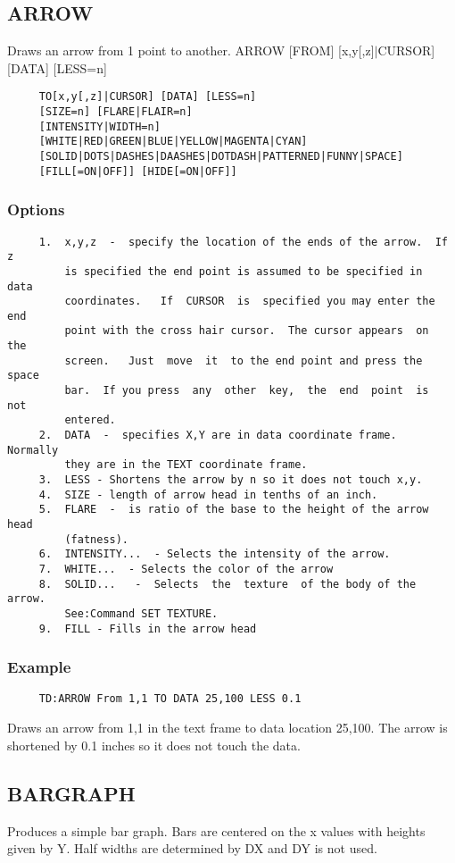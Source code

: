 \subsection{ARROW}
Draws an arrow from 1 point to another.  
ARROW [FROM] [x,y[,z]$|$CURSOR] [DATA] [LESS=n] 
\begin{verbatim}
     TO[x,y[,z]|CURSOR] [DATA] [LESS=n] 
     [SIZE=n] [FLARE|FLAIR=n] 
     [INTENSITY|WIDTH=n] 
     [WHITE|RED|GREEN|BLUE|YELLOW|MAGENTA|CYAN] 
     [SOLID|DOTS|DASHES|DAASHES|DOTDASH|PATTERNED|FUNNY|SPACE] 
     [FILL[=ON|OFF]] [HIDE[=ON|OFF]] 
\end{verbatim}
\subsubsection{Options}
\begin{verbatim}
     1.  x,y,z  -  specify the location of the ends of the arrow.  If z
         is specified the end point is assumed to be specified in  data
         coordinates.   If  CURSOR  is  specified you may enter the end
         point with the cross hair cursor.  The cursor appears  on  the
         screen.   Just  move  it  to the end point and press the space
         bar.  If you press  any  other  key,  the  end  point  is  not
         entered.  
     2.  DATA  -  specifies X,Y are in data coordinate frame.  Normally
         they are in the TEXT coordinate frame.  
     3.  LESS - Shortens the arrow by n so it does not touch x,y.  
     4.  SIZE - length of arrow head in tenths of an inch.  
     5.  FLARE  -  is ratio of the base to the height of the arrow head
         (fatness).  
     6.  INTENSITY...  - Selects the intensity of the arrow.  
     7.  WHITE...  - Selects the color of the arrow 
     8.  SOLID...   -  Selects  the  texture  of the body of the arrow.
         See:Command SET TEXTURE.  
     9.  FILL - Fills in the arrow head 
\end{verbatim}
\subsubsection{Example}
\begin{verbatim}
     TD:ARROW From 1,1 TO DATA 25,100 LESS 0.1 
\end{verbatim}
Draws an arrow from 1,1 in the text frame to data location 25,100.  The
arrow is shortened by 0.1 inches so it does not touch the data.  
\subsection{BARGRAPH}
Produces  a  simple  bar  graph.   Bars are centered on the x values with
heights given by Y.  Half widths are determined by DX and DY is not used. 

